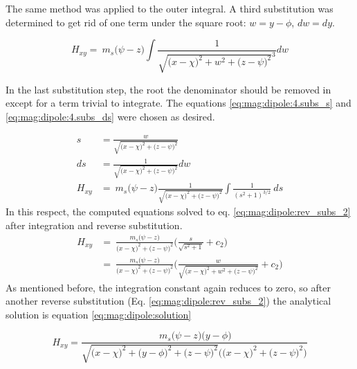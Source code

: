 The same method was applied to the outer integral. A third substitution was determined to get rid of one term under the square root: $w=y-\phi$, $dw=dy$.

\begin{equation}
H_{xy} =\ m_s\big(\psi - z\big)  \int \frac{1}{\sqrt{\big( x- \chi\big)^2 + w^2 + \big(z- \psi\big)^2}^3} dw
\end{equation}

In the last substitution step, the root the denominator should be removed in  except for a term trivial to integrate. The equations \ref{eq:mag:dipole:4.subs_s} and \ref{eq:mag:dipole:4.subs_ds} were chosen as desired.

\begin{align}
s &= \frac{w}{\sqrt{\big( x- \chi\big)^2 + \big(z- \psi\big)^2}
	\label{eq:mag:dipole:4.subs_s}}\\
ds &= \frac{1}{\sqrt{\big( x- \chi\big)^2 + \big(z- \psi\big)^2}}dw
\label{eq:mag:dipole:4.subs_ds}\\
H_{xy} &=\ m_s\big(\psi - z\big) \frac{1}{\sqrt{\big( x- \chi\big)^2 + \big(z- \psi\big)^2}} \int \frac{1}{(s^2+1)^{3/2}}\ ds
\end{align}
\newpage
In this respect, the computed equations solved to eq. \ref{eq:mag:dipole:rev_subs_2} after integration and reverse substitution.
\begin{align}
H_{xy} &=\ \frac{m_s\big(\psi - z\big)}{\big( x- \chi\big)^2 + \big(z- \psi\big)^2} \Bigg( \frac{s}{\sqrt{s^2+1}} + c_2\Bigg)\\
&=\ \frac{m_s\big(\psi - z\big)}{\big( x- \chi\big)^2 + \big(z- \psi\big)^2} \Bigg( \frac{w}{\sqrt{\big( x- \chi\big)^2 + w^2 + \big(z- \psi\big)^2}} + c_2\Bigg) \label{eq:mag:dipole:rev_subs_2}
\end{align}
As mentioned before, the integration constant again reduces to zero, so after another reverse substitution (Eq. \ref{eq:mag:dipole:rev_subs_2}) the analytical solution is equation \ref{eq:mag:dipole:solution}

\begin{equation}
H_{xy}= \frac{\ m_s\big(\psi - z\big)\big(y - \phi\big)}{\sqrt{\big( x- \chi\big)^2 + \big(y- \phi\big)^2 + \big(z- \psi\big)^2}\Big(\big( x- \chi\big)^2 + \big(z- \psi\big)^2\Big)} \label{eq:mag:dipole:solution}
\end{equation}


%
%
%
%
%


